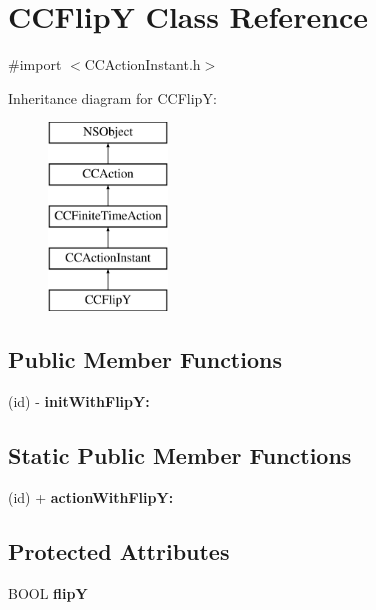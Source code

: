 \hypertarget{interface_c_c_flip_y}{\section{C\-C\-Flip\-Y Class Reference}
\label{interface_c_c_flip_y}
}


{\ttfamily \#import $<$C\-C\-Action\-Instant.\-h$>$}

Inheritance diagram for C\-C\-Flip\-Y\-:\begin{figure}[H]
\begin{center}
\leavevmode
\includegraphics[height=5.000000cm]{interface_c_c_flip_y}
\end{center}
\end{figure}
\subsection*{Public Member Functions}
\begin{DoxyCompactItemize}
\item 
\hypertarget{interface_c_c_flip_y_a46b46d84889e472205ab53f89f2fc278}{(id) -\/ {\bfseries init\-With\-Flip\-Y\-:}}\label{interface_c_c_flip_y_a46b46d84889e472205ab53f89f2fc278}

\end{DoxyCompactItemize}
\subsection*{Static Public Member Functions}
\begin{DoxyCompactItemize}
\item 
\hypertarget{interface_c_c_flip_y_ae7fab176ad843f9ba3c06a59b4bb8bf7}{(id) + {\bfseries action\-With\-Flip\-Y\-:}}\label{interface_c_c_flip_y_ae7fab176ad843f9ba3c06a59b4bb8bf7}

\end{DoxyCompactItemize}
\subsection*{Protected Attributes}
\begin{DoxyCompactItemize}
\item 
\hypertarget{interface_c_c_flip_y_a71e1d2921b6e2c34351d486e2fa91b82}{B\-O\-O\-L {\bfseries flip\-Y}}\label{interface_c_c_flip_y_a71e1d2921b6e2c34351d486e2fa91b82}

\end{DoxyCompactItemize}


